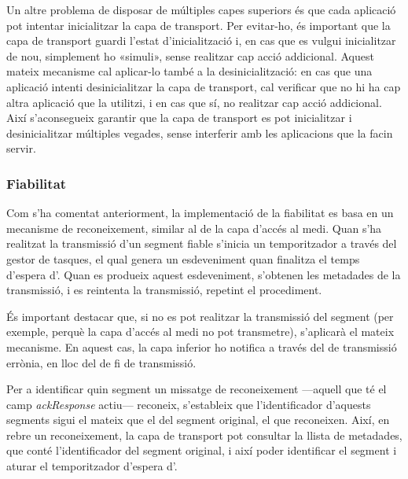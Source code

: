 \documentclass{tfgitic}[2024/07/01]
\begin{document}
{Un altre problema de disposar de múltiples capes superiors és que cada aplicació pot intentar inicialitzar la capa de transport. Per evitar-ho, és important que la capa de transport guardi l'estat d'inicialització i, en cas que es vulgui inicialitzar de nou, simplement ho «simuli», sense realitzar cap acció addicional. Aquest mateix mecanisme cal aplicar-lo també a la desinicialització: en cas que una aplicació intenti desinicialitzar la capa de transport, cal verificar que no hi ha cap altra aplicació que la utilitzi, i en cas que sí, no realitzar cap acció addicional. Així s’aconsegueix garantir que la capa de transport es pot inicialitzar i desinicialitzar múltiples vegades, sense interferir amb les aplicacions que la facin servir.
\subsubsection{Fiabilitat}
\label{subsubsec:transport_fiabilitat}
Com s'ha comentat anteriorment, la implementació de la fiabilitat es basa en un mecanisme de reconeixement, similar al de la capa d'accés al medi.
Quan s'ha realitzat la transmissió d'un segment fiable s'inicia un temporitzador a través del gestor de tasques, el qual genera un esdeveniment quan finalitza el temps d'espera d'. Quan es produeix aquest esdeveniment, s'obtenen les metadades de la transmissió, i es reintenta la transmissió, repetint el procediment.

És important destacar que, si no es pot realitzar la transmissió del segment (per exemple, perquè la capa d'accés al medi no pot transmetre), s'aplicarà el mateix mecanisme. En aquest cas, la capa inferior ho notifica a través del  de transmissió errònia, en lloc del de fi de transmissió.

Per a identificar quin segment un missatge de reconeixement ---aquell que té el camp \emph{ackResponse} actiu--- reconeix, s'estableix que l'identificador d'aquests segments sigui el mateix que el del segment original, el que reconeixen. Així, en rebre un reconeixement, la capa de transport pot consultar la llista de metadades, que conté l'identificador del segment original, i així poder identificar el segment i aturar el temporitzador d'espera d'.

}
\end{document}
